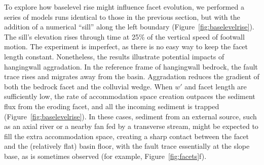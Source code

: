 To explore how baselevel rise might influence facet evolution, we performed a series of models runs identical to those in the previous section, but with the addition of a numerical ``sill'' along the left boundary (Figure~\ref{fig:baselevelrise}). The sill's elevation rises through time at 25\% of the vertical speed of footwall motion. The experiment is imperfect, as there is no easy way to keep the facet length constant. Nonetheless, the results illustrate potential impacts of hangingwall aggradation. In the reference frame of hangingwall bedrock, the fault trace rises and migrates away from the basin. Aggradation reduces the gradient of both the bedrock facet and the colluvial wedge. When $w'$ and facet length are sufficiently low, the rate of accommodation space creation outpaces the sediment flux from the eroding facet, and all the incoming sediment is trapped (Figure~\ref{fig:baselevelrise}). In these cases, sediment from an external source, such as an axial river or a nearby fan fed by a transverse stream, might be expected to fill the extra accommodation space, creating a sharp contact between the facet and the (relatively flat) basin floor, with the fault trace essentially at the slope base, as is sometimes observed (for example, Figure~\ref{fig:facets}f). 



